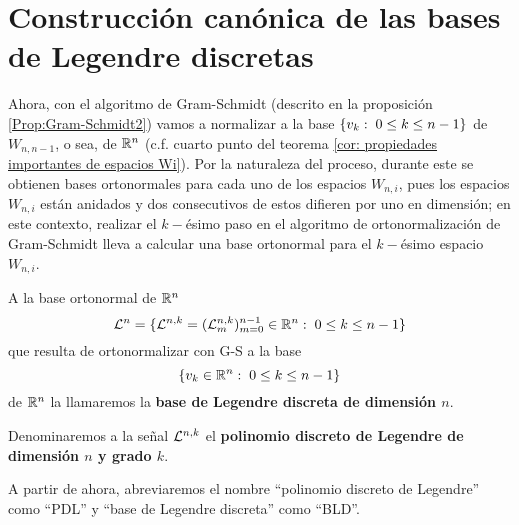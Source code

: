 \section{Construcción canónica de las bases de Legendre discretas}

\noindent Ahora, con el 
algoritmo de Gram-Schmidt (descrito
en la proposición \ref{Prop:Gram-Schmidt2})
vamos a normalizar
a la base $\{v_{k}: \hspace{0.1cm} 0 \leq k \leq n-1 \}$ de
$W_{n,n-1}$, o sea, de $\mathbb{R}^{n}$ (c.f. 
cuarto punto del teorema
\ref{cor: propiedades importantes de espacios Wi}). 
Por la naturaleza del proceso, durante este se
obtienen bases ortonormales para cada uno de los espacios 
$W_{n,i}$, pues los espacios $W_{n,i}$ están anidados y dos consecutivos
de estos difieren por uno en dimensión; en este contexto, realizar
el $k-$ésimo paso en el algoritmo de ortonormalización de Gram-Schmidt
lleva a calcular una base ortonormal para el $k-$ésimo espacio $W_{n,i}$.




\begin{defi} 
\label{def: base de Legendre discreta}
A la base ortonormal de $\mathbb{R}^{n}$
\begin{equation}
\label{eq: base de Legendre discreta}
\mathcal{L}^{n}=\{ \mathcal{L}^{n,k}= (\mathcal{L}_{m}^{n,k})_{m=0}^{n-1} \in \mathbb{R}^{n}: 
\hspace{0.1cm} 0 \leq k \leq n-1\}
\end{equation}
que resulta de ortonormalizar con G-S a la base
\[
\{v_{k} \in \mathbb{R}^{n}: \hspace{0.1cm} 0 \leq k \leq n-1 \}
\]
de $\mathbb{R}^{n}$ la llamaremos la
\textbf{base de Legendre discreta de dimensión $n$}.

Denominaremos a la señal $\mathcal{L}^{n,k}$ el 
\textbf{polinomio discreto de Legendre de dimensión
$n$ y grado $k$}.
\end{defi}

\begin{nota}
A partir de ahora, abreviaremos el nombre
``polinomio discreto de Legendre''
como ``PDL'' y ``base de Legendre discreta'' como ``BLD''.
\end{nota}

